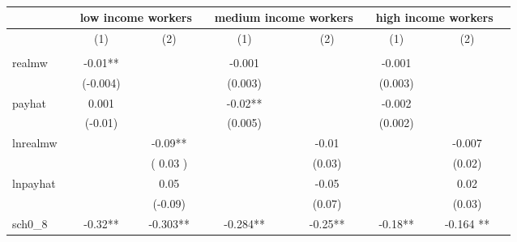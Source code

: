 \documentclass{article}
\begin{document}
\begin{landscape} 
\begin{table}[ht]
\centering
\caption{}
\label{my-label}
\begin{tabular}{llclclclclclcl}
                       \hline
                       &  & \multicolumn{3}{c}{low income workers} &  & \multicolumn{3}{c}{medium income workers} &  & \multicolumn{3}{c}{high income workers} &  \\
                       \hline
                       &  & (1)    &     & (2)   &  & (1)     &      & (2)    &  & (1)    &     & (2)    &  \\
                       \hline
                       &  &                 &     &                &  &                  &      &                 &  &                 &     &                 &  \\
realmw                 &  & -0.01**      &     &                &  & -0.001       &      &                 &  & -0.001      &     &       &  \\
                       &  & (-0.004)       &     &                &  & (0.003)         &      &                 &  & (0.003)       &     &       &  \\
payhat                 &  & 0.001        &     &                &  & -0.02**       &      &                 &  & -0.002     &     &         &  \\
                       &  & (-0.01)       &     &                &  &(0.005)        &      &                 &  & (0.002)       &     &         &  \\
lnrealmw               &  &                 &     & -0.09**        &  &                  &      & -0.01       &  &                 &     &-0.007                 &  \\
                       &  &                 &     & ( 0.03 )   &  &                  &      & (0.03)       &  &                 &     & (0.02)                  &  \\
lnpayhat               &  &                 &     & 0.05       &  &                  &      & -0.05      &  &                 &     &0.02                 &  \\
                       &  &                 &     & (-0.09)   &  &                  &      & (0.07)       &  &                 &     & (0.03)                &  \\
sch0\_8                &  & -0.32**       &     & -0.303**     &  & -0.284**         &      & -0.25**      &  & -0.18**      &     & -0.164 **     &  \\

\end{tabular}
\end{table}
\end{landscape}
\end{document}
